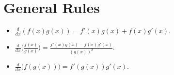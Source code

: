 \documentclass[addpoints, 12pt]{exam}%
\theoremstyle{definition}
\begin{document}
\section{General Rules}

\begin{itemize}
\item $\displaystyle\frac{d}{dx} (f (x) g(x)) = f' (x) g(x) + f(x) g' (x)$.
\item $\displaystyle \frac{d}{dx} \Big( \frac{f(x)}{g(x)} \Big) = \frac{f' (x) g(x) - f(x) g'(x)}{(g(x))^2}$.
\item $\displaystyle \frac{d}{dx} \big( f (g(x)) \big) = f' (g(x)) g' (x)$.
\end{itemize}
\end{document}
